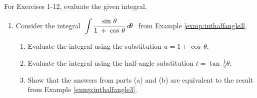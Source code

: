 {\small
{}
\par\noindent For Exercises 1-12, evaluate the given integral.
\begin{enumerate}[\bfseries 1.]
 \item Consider the integral $~\displaystyle\int \frac{\sin\,\theta}{1 \;+\;
  \cos\,\theta}\,d\!\theta~$ from Example \ref{exmp:inthalfangle3}.
  \begin{enumerate}[\bfseries (a)]
   \item Evaluate the integral using the substitution $u=1 + \cos\,\theta$.
   \item Evaluate the integral using the half-angle substitution
    $t = \tan\,\tfrac{1}{2}\theta$.
   \item Show that the answers from parts (a) and (b) are equivalent to the
    result from Example \ref{exmp:inthalfangle3}.
  \end{enumerate}

\end{enumerate}}
